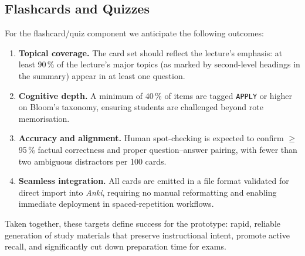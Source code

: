 \documentclass[
12pt,
paper=a4,
,captions=tableheading
]{scrartcl}
\begin{document}
	\pagebreak

	\subsection{Flashcards and Quizzes}\label{results:flashcards}

	For the flashcard/quiz component we anticipate the following outcomes:

	\begin{enumerate}
	\item \textbf{Topical coverage.}  The card set should reflect the lecture’s emphasis: at least 90\,\% of the lecture's major topics (as marked by second-level headings in the summary) appear in at least one question.
	\item \textbf{Cognitive depth.}  A minimum of 40\,\% of items are tagged \texttt{APPLY} or higher on Bloom’s taxonomy, ensuring students are challenged beyond rote memorisation.
	\item \textbf{Accuracy and alignment.}  Human spot-checking is expected to confirm \(\geq\) 95\,\% factual correctness and proper question–answer pairing, with fewer than two ambiguous distractors per 100 cards.
	\item \textbf{Seamless integration.}  All cards are emitted in a file format validated for direct import into \emph{Anki}, requiring no manual reformatting and enabling immediate deployment in spaced-repetition workflows.
	\end{enumerate}

	Taken together, these targets define success for the prototype: rapid, reliable generation of study materials that preserve instructional intent, promote active recall, and significantly cut down preparation time for exams.
	
\end{document}
